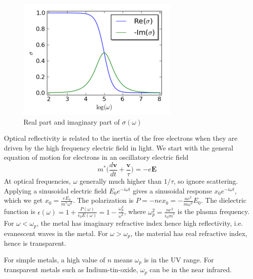 \documentclass[a4paper]{article}
\begin{document}
\begin{figure}[H]
    \centering
    \includegraphics[scale=0.85]{ACcondrude.png}
    \caption{Real part and imaginary part of $\sigma(\omega)$}
\end{figure}
\begin{Note}
Optical reflectivity is related to the inertia of the free electrons when they are driven by the high frequency electric field in light. We start with the general equation of motion for electrons in an oscillatory electric field
$$m^*\bigg(\frac{d\mathbf{v}}{dt}+\frac{\mathbf{v}}{\tau}\bigg)=-e\mathbf{E}$$
At optical frequencies, $\omega$ generally much higher than $1/\tau$, so ignore scattering. Applying a sinusoidal electric field $E_0e^{-i\omega t}$ gives a sinusoidal response $x_0e^{-i\omega t}$, which we get $x_0=\frac{eE_0}{m^*\omega^2}$. The polarization is $P=-nex_0=-\frac{ne^2}{m\omega^2}E_0$. The dielectric function is $\epsilon(\omega)=1+\frac{P(\omega)}{\epsilon_0E(\omega)}=1-\frac{\omega_p^2}{\omega^2}$, where $\omega_p^2=\frac{ne^2}{\epsilon_0m^*}$ is the plasma frequency. For $\omega<\omega_p$, the metal has imaginary refractive index hence high reflectivity, i.e. evanescent waves in the metal. For $\omega>\omega_p$, the material has real refractive index, hence is transparent.
\end{Note}
\begin{eg}
For simple metals, a high value of $n$ means $\omega_p$ is in the UV range. For transparent metals such as Indium-tin-oxide, $\omega_p$ can be in the near infrared.
\end{eg}
\newpage
\end{document}
